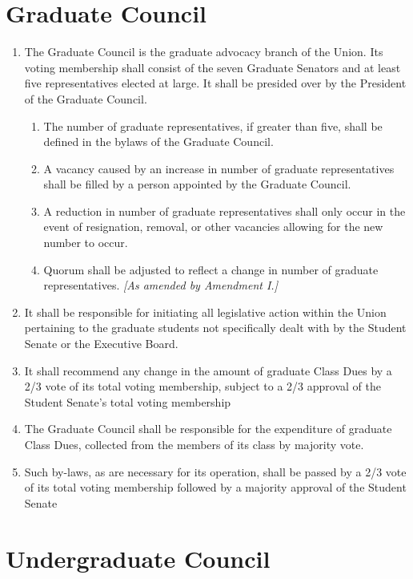 \documentclass{uniondoc}
\begin{document}
\section{Graduate Council}

\begin{enumerate}
\item The Graduate Council is the graduate advocacy branch of the Union. Its voting membership shall consist of the seven Graduate Senators and at least five representatives elected at large. It shall be presided over by the President of the Graduate Council.
  \begin{enumerate}
  \item The number of graduate representatives, if greater than five, shall be defined in the bylaws of the Graduate Council.
  \item A vacancy caused by an increase in number of graduate representatives shall be filled by a person appointed by the Graduate Council.
  \item A reduction in number of graduate representatives shall only occur in the event of resignation, removal, or other vacancies allowing for the new number to occur.
  \item Quorum shall be adjusted to reflect a change in number of graduate representatives. \textit{[As amended by Amendment I.]}
  \end{enumerate}
\item It shall be responsible for initiating all legislative action within the Union pertaining to the graduate students not specifically dealt with by the Student Senate or the Executive Board.
\item It shall recommend any change in the amount of graduate Class Dues by a 2/3 vote of its total voting membership, subject to a 2/3 approval of the Student Senate's total voting membership
\item The Graduate Council shall be responsible for the expenditure of graduate Class Dues, collected from the members of its class by majority vote.
\item Such by-laws, as are necessary for its operation, shall be passed by a 2/3 vote of its total voting membership followed by a majority approval of the Student Senate
\end{enumerate}

\section{Undergraduate Council}
\end{document}
